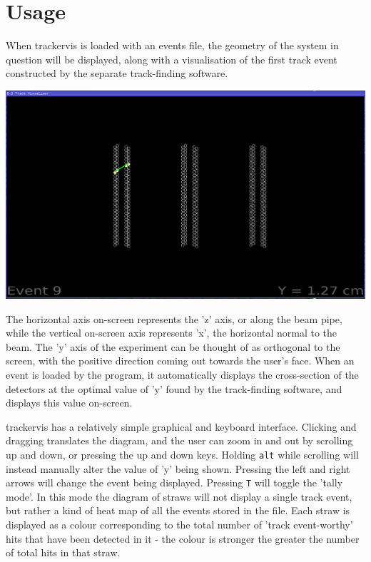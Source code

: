 \documentclass[12pt]{article}
\begin{document}
\section*{Usage}

When trackervis is loaded with an events file, the geometry of the system in question will be displayed, along with a visualisation of the first track event constructed by the separate track-finding software.\newline

\includegraphics[width=\textwidth]{pic1}

The horizontal axis on-screen represents the 'z' axis, or along the beam pipe, while the vertical on-screen axis represents 'x', the horizontal normal to the beam. The 'y' axis of the experiment can be thought of as orthogonal to the screen, with the positive direction coming out towards the user's face. When an event is loaded by the program, it automatically displays the cross-section of the detectors at the optimal value of 'y' found by the track-finding software, and displays this value on-screen.\newline

trackervis has a relatively simple graphical and keyboard interface. Clicking and dragging translates the diagram, and the user can zoom in and out by scrolling up and down, or pressing the up and down keys. Holding \verb|alt| while scrolling will instead manually alter the value of 'y' being shown. Pressing the left and right arrows will change the event being displayed. Pressing \verb|T| will toggle the 'tally mode'. In this mode the diagram of straws will not display a single track event, but rather a kind of heat map of all the events stored in the file. Each straw is displayed as a colour corresponding to the total number of 'track event-worthy' hits that have been detected in it - the colour is stronger the greater the number of total hits in that straw.\newline
\end{document}
